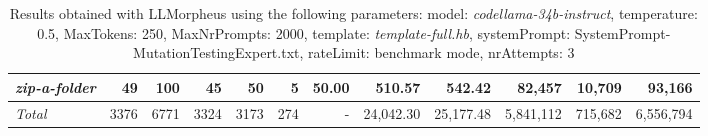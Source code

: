 \begin{table*}
{\begin{tabular}{l||r|r|r|r|r|r||r|r||r|r|r}
   \hline
   \textit{zip-a-folder} & 49 & 100 & 45 & 50 & 5 & 50.00 & 510.57 & 542.42 & 82,457 & 10,709 & 93,166 \\ 
   \hline
   \textit{Total} & 3376 & 6771 & 3324 & 3173 & 274 & - & 24,042.30  & 25,177.48 & 5,841,112 & 715,682 & 6,556,794 \\ 
 \end{tabular}
 }
 \caption{Results obtained with LLMorpheus using the following parameters: 
   model: \textit{codellama-34b-instruct}, 
   temperature: 0.5, 
   MaxTokens: 250, 
   MaxNrPrompts: 2000, 
   template: \textit{template-full.hb}, 
   systemPrompt: SystemPrompt-MutationTestingExpert.txt, 
   rateLimit: benchmark mode, 
   nrAttempts: 3  
 }
\end{table*}

